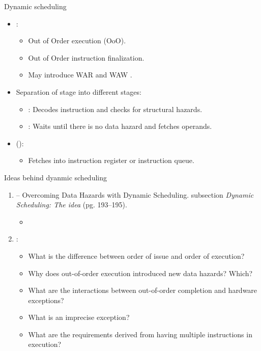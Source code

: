 \begin{frame}[t]{Dynamic scheduling}
\begin{itemize}
  \item {}:
    \begin{itemize}
      \item Out of Order execution (OoO).
      \item Out of Order instruction finalization.
      \item May introduce WAR and WAW .
    \end{itemize}

  \item Separation of  stage into   different stages:
    \begin{itemize}
      \item {}: 
            Decodes instruction and checks for structural hazards.
      \item {}: 
            Waits until there is no data hazard and fetches operands.
    \end{itemize}

  \item {} ():
    \begin{itemize}
      \item Fetches into instruction register or instruction queue.
    \end{itemize}
\end{itemize}
\end{frame}

\begin{frame}[t]{Ideas behind dyanmic scheduling}
  \begin{enumerate}
    \item {}  --
          Overcoming Data Hazards with Dynamic Scheduling.
           subsection \emph{Dynamic Scheduling: The idea}
          (pg. 193--195).
      \begin{itemize}
        \item \bibhennessy
      \end{itemize}

    \item {}:
      \begin{itemize}
        \item What is the difference between order of issue and order of execution?
        \item Why does out-of-order execution introduced new data hazards? Which?
        \item What are the interactions between out-of-order completion and hardware exceptions?
        \item What is an imprecise exception?
        \item What are the requirements derived from having multiple instructions in execution?
      \end{itemize}
  \end{enumerate}
\end{frame}

